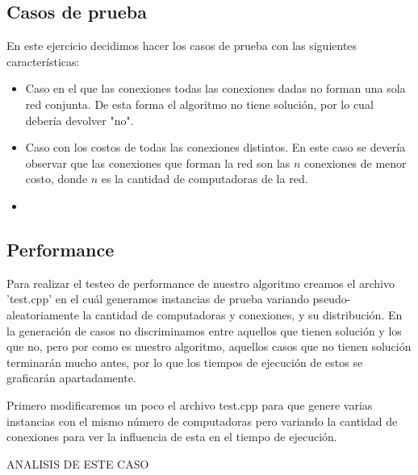 \newpage


\subsection{Casos de prueba}

En este ejercicio decidimos hacer los casos de prueba con las siguientes caracter\'isticas:

\begin{itemize}
\item Caso en el que las conexiones todas las conexiones dadas no forman una sola red conjunta. De esta forma el algoritmo no tiene solución, por lo cual debería devolver "no".
\item Caso con los costos de todas las conexiones distintos. En este caso se devería observar que las conexiones que forman la red son las $n$ conexiones de menor costo, donde $n$ es la cantidad de computadoras de la red.
\item 
\end{itemize}


\newpage


\subsection{Performance}

Para realizar el testeo de performance de nuestro algoritmo creamos el archivo 'test.cpp' en el cu\'al generamos instancias de prueba variando pseudo-aleatoriamente la cantidad de computadoras y conexiones, y su distribuci\'on.
En la generación de casos no discriminamos entre aquellos que tienen soluci\'on y los que no, pero por como es nuestro algoritmo, aquellos casos que no tienen soluci\'on terminarán mucho antes, por lo que los tiempos de ejecuci\'on de estos se graficarán apartadamente.

Primero modificaremos un poco el archivo test.cpp para que genere varias instancias con el mismo n\'umero de computadoras pero variando la cantidad de conexiones para ver la influencia de esta en el tiempo de ejecuci\'on.

ANALISIS DE ESTE CASO




